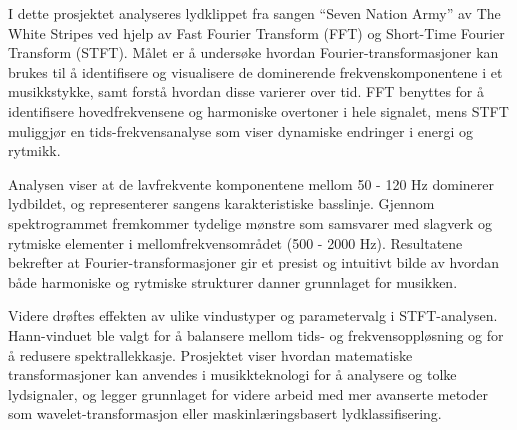 I dette prosjektet analyseres lydklippet fra sangen “Seven Nation Army” 
av The White Stripes ved hjelp av Fast Fourier Transform (FFT) og Short-Time 
Fourier Transform (STFT). Målet er å undersøke hvordan Fourier-transformasjoner 
kan brukes til å identifisere og visualisere de dominerende 
frekvenskomponentene i et musikkstykke, samt forstå hvordan disse 
varierer over tid. FFT benyttes for å identifisere hovedfrekvensene og 
harmoniske overtoner i hele signalet, mens STFT muliggjør en tids-frekvensanalyse 
som viser dynamiske endringer i energi og rytmikk.

Analysen viser at de lavfrekvente komponentene mellom 50 - 120 Hz dominerer lydbildet, 
og representerer sangens karakteristiske basslinje. Gjennom spektrogrammet fremkommer 
tydelige mønstre som samsvarer med slagverk og rytmiske elementer i mellomfrekvensområdet 
(500 - 2000 Hz). Resultatene bekrefter at Fourier-transformasjoner gir et presist og 
intuitivt bilde av hvordan både harmoniske og rytmiske strukturer danner grunnlaget for musikken.

Videre drøftes effekten av ulike vindustyper og parametervalg i STFT-analysen. 
Hann-vinduet ble valgt for å balansere mellom tids- og frekvensoppløsning og 
for å redusere spektrallekkasje. Prosjektet viser hvordan matematiske transformasjoner 
kan anvendes i musikkteknologi for å analysere og tolke lydsignaler, og legger 
grunnlaget for videre arbeid med mer avanserte metoder som wavelet-transformasjon 
eller maskinlæringsbasert lydklassifisering.